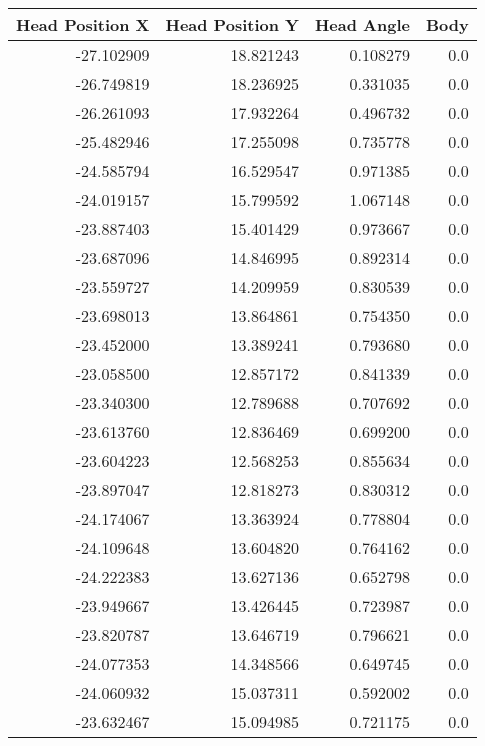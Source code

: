 \begin{tabular}{rrrr}
\toprule
 Head Position X &  Head Position Y &  Head Angle &  Body \\
\midrule
      -27.102909 &        18.821243 &    0.108279 &   0.0 \\
      -26.749819 &        18.236925 &    0.331035 &   0.0 \\
      -26.261093 &        17.932264 &    0.496732 &   0.0 \\
      -25.482946 &        17.255098 &    0.735778 &   0.0 \\
      -24.585794 &        16.529547 &    0.971385 &   0.0 \\
      -24.019157 &        15.799592 &    1.067148 &   0.0 \\
      -23.887403 &        15.401429 &    0.973667 &   0.0 \\
      -23.687096 &        14.846995 &    0.892314 &   0.0 \\
      -23.559727 &        14.209959 &    0.830539 &   0.0 \\
      -23.698013 &        13.864861 &    0.754350 &   0.0 \\
      -23.452000 &        13.389241 &    0.793680 &   0.0 \\
      -23.058500 &        12.857172 &    0.841339 &   0.0 \\
      -23.340300 &        12.789688 &    0.707692 &   0.0 \\
      -23.613760 &        12.836469 &    0.699200 &   0.0 \\
      -23.604223 &        12.568253 &    0.855634 &   0.0 \\
      -23.897047 &        12.818273 &    0.830312 &   0.0 \\
      -24.174067 &        13.363924 &    0.778804 &   0.0 \\
      -24.109648 &        13.604820 &    0.764162 &   0.0 \\
      -24.222383 &        13.627136 &    0.652798 &   0.0 \\
      -23.949667 &        13.426445 &    0.723987 &   0.0 \\
      -23.820787 &        13.646719 &    0.796621 &   0.0 \\
      -24.077353 &        14.348566 &    0.649745 &   0.0 \\
      -24.060932 &        15.037311 &    0.592002 &   0.0 \\
      -23.632467 &        15.094985 &    0.721175 &   0.0 \\

\end{tabular}
